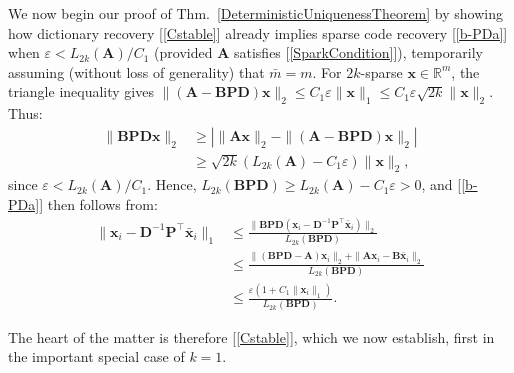 \documentclass[9pt,twocolumn]{pnas-new}
\renewcommand{\eqref}[1]{\textnormal{[\ref{#1}]}}
\begin{document}


We now begin our proof of Thm.~\ref{DeterministicUniquenessTheorem} by showing how dictionary recovery \eqref{Cstable} already implies sparse code recovery \eqref{b-PDa} when \mbox{$\varepsilon < L_{2k}(\mathbf{A}) / C_1$} (provided $\mathbf{A}$ satisfies \eqref{SparkCondition}), temporarily assuming (without loss of generality) that $\bar m = m$. 
For $2k$-sparse $\mathbf{x} \in \mathbb{R}^m$, the triangle inequality gives \mbox{$\|(\mathbf{A}-\mathbf{BPD})\mathbf{x}\|_2  \leq C_1\varepsilon \|\mathbf{x}\|_1 \leq C_1 \varepsilon \sqrt{2k}  \|\mathbf{x}\|_2$}. Thus:
\begin{align*}
\|\mathbf{BPD}\mathbf{x}\|_2 
&\geq | \|\mathbf{A}\mathbf{x}\|_2 - \|(\mathbf{A}-\mathbf{BPD})\mathbf{x}\|_2 | \\
&\geq \sqrt{2k} (L_{2k}(\mathbf{A}) -  C_1\varepsilon) \|\mathbf{x}\|_2,
\end{align*}
%
since $\varepsilon < L_{2k}(\mathbf{A}) / C_1$. Hence, $L_{2k}(\mathbf{BPD}) \geq L_{2k}(\mathbf{A}) - C_1\varepsilon  > 0$, and \eqref{b-PDa} then follows from:
\begin{align*}
\|\mathbf{x}_i - \mathbf{D}^{-1}\mathbf{P}^{\top}\mathbf{\bar x}_i \|_1
&\leq \frac{\|\mathbf{BPD}(\mathbf{x}_i - \mathbf{D}^{-1}\mathbf{P}^{\top}\mathbf{\bar x}_i)\|_2}{L_{2k}(\mathbf{BPD})} \\
&\leq \frac{\|(\mathbf{BPD} - \mathbf{A})\mathbf{x}_i\|_2 + \|\mathbf{A}\mathbf{x}_i - \mathbf{B}\mathbf{\bar x}_i\|_2}{L_{2k}(\mathbf{BPD})} \\
&\leq \frac{\varepsilon (1 + C_1 \|\mathbf{x}_i\|_1)}{L_{2k}(\mathbf{BPD})}.
\end{align*}

The heart of the matter is therefore \eqref{Cstable}, which we now establish, first in the important special case of $k = 1$. 
\end{document}
